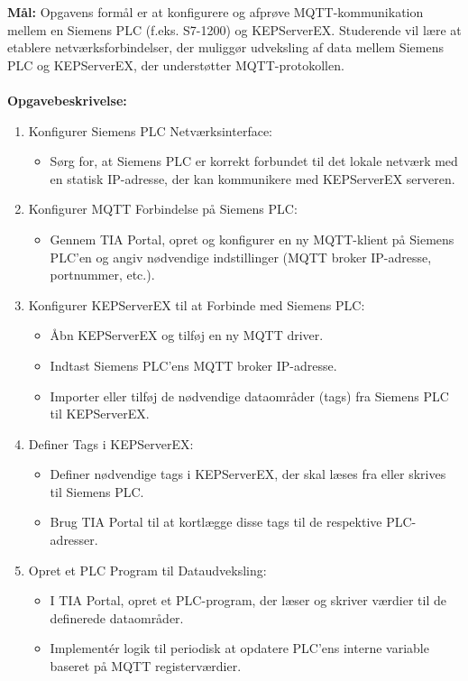 \textbf{Mål:} Opgavens formål er at konfigurere og afprøve MQTT-kommunikation mellem en Siemens PLC (f.eks. S7-1200) og KEPServerEX. Studerende vil lære at etablere netværksforbindelser, der muliggør udveksling af data mellem Siemens PLC og KEPServerEX, der understøtter MQTT-protokollen.
\\\\
\noindent\textbf{Opgavebeskrivelse:}
\begin{enumerate}
	\item Konfigurer Siemens PLC Netværksinterface:
	\begin{itemize}
		\item Sørg for, at Siemens PLC er korrekt forbundet til det lokale netværk med en statisk IP-adresse, der kan kommunikere med KEPServerEX serveren.
	\end{itemize}
	\item Konfigurer MQTT Forbindelse på Siemens PLC:
	\begin{itemize}
		\item Gennem TIA Portal, opret og konfigurer en ny MQTT-klient på Siemens PLC'en og angiv nødvendige indstillinger (MQTT broker IP-adresse, portnummer, etc.).
	\end{itemize}
	\item Konfigurer KEPServerEX til at Forbinde med Siemens PLC:
	\begin{itemize}
		\item Åbn KEPServerEX og tilføj en ny MQTT driver.
		\item Indtast Siemens PLC’ens MQTT broker IP-adresse.
		\item Importer eller tilføj de nødvendige dataområder (tags) fra Siemens PLC til KEPServerEX.
	\end{itemize}
	\item Definer Tags i KEPServerEX:
	\begin{itemize}
		\item Definer nødvendige tags i KEPServerEX, der skal læses fra eller skrives til Siemens PLC.
		\item Brug TIA Portal til at kortlægge disse tags til de respektive PLC-adresser.
	\end{itemize}
	\item Opret et PLC Program til Dataudveksling:
	\begin{itemize}
		\item I TIA Portal, opret et PLC-program, der læser og skriver værdier til de definerede dataområder.
		\item Implementér logik til periodisk at opdatere PLC'ens interne variable baseret på MQTT registerværdier.

\end{itemize}
\end{enumerate}
